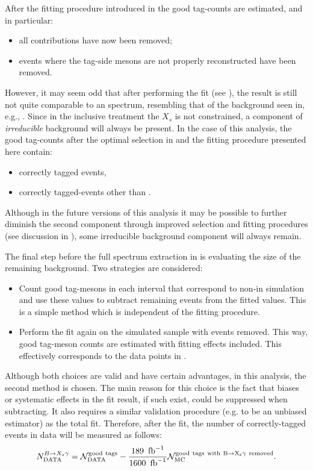 After the fitting procedure introduced in  the good tag-\B counts are estimated, and in particular:
\begin{itemize}
    \item all \epem\ra\qqbar contributions have now been removed;
    \item events where the tag-side \B mesons are not properly reconstructed have been removed.
\end{itemize}

However, it may seem odd that after performing the \Mbc fit (see ), the result is still not quite comparable to an \EB spectrum,
resembling that of the background seen in, e.g., .
Since in the inclusive treatment the $X_s$ is not constrained, a component of \textit{irreducible} background will always be present.
In the case of this analysis, the good tag-\B counts after the optimal selection in  and the fitting procedure presented here contain:
\begin{itemize}
    \item correctly tagged \BtoXsgamma events,
    \item correctly tagged-\BB events other than \BtoXsgamma.
\end{itemize}
Although in the future versions of this analysis it may be possible to further diminish the second component through improved selection and fitting procedures (see discussion in ), 
some irreducible background component will always remain.

The final step before the full \BtoXsgamma spectrum extraction in \MC is evaluating the size of the remaining \BB background.
Two strategies are considered:
\begin{itemize}
    \item Count good tag-\B mesons in each \EB interval that correspond to non-\BtoXsgamma in simulation and use these values to subtract remaining \BB events from the fitted values.
    This is a simple method which is independent of the fitting procedure.
    \item Perform the fit again on the simulated sample with \BtoXsgamma events removed.
    This way, good tag-\B meson counts are estimated with fitting effects included.
    This effectively corresponds to the data points in .
\end{itemize}
Although both choices are valid and have certain advantages, in this analysis, the second method is chosen.
The main reason for this choice is the fact that biases or systematic effects in the fit result, if such exist, could be suppressed when subtracting.
It also requires a similar validation procedure (e.g. to be an unbiased estimator) as the total fit.
Therefore, after the \Mbc fit, the number of correctly-tagged \BtoXsgamma events in data will be measured as follows:
\begin{equation}\label{eq:background_subtraction}
    N_{\mathrm{DATA}}^{\BtoXsgamma} = \mathcal{N}_{\mathrm{DATA}}^{\mathrm{good~tags}}  - \frac{189~\invfb}{1600~\invfb} \mathcal{N}_{\mathrm{MC}}^{\mathrm{good~tags~with~\BtoXsgamma~removed}}.
\end{equation}